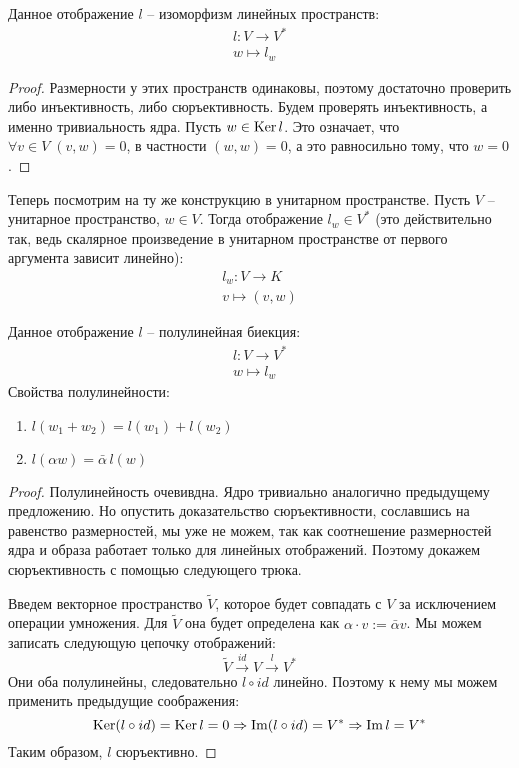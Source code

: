 \begin{theorem-non}
    Данное отображение $l$ -- изоморфизм линейных пространств: \begin{gather*}
        l: V \to  V^* \\
        w \mapsto  l_w
    \end{gather*}
\end{theorem-non}
\begin{proof}
    Размерности у этих пространств одинаковы, поэтому достаточно проверить либо инъективность, либо сюръективность.
    Будем проверять инъективность, а именно тривиальность ядра. Пусть $w \in \operatorname{Ker} l$. Это означает, что $\forall v \in V \; (v, w) = 0$, в частности $(w, w) = 0$, а это равносильно тому, что $w = 0$.
\end{proof}

\vspace*{7mm}

Теперь посмотрим на ту же конструкцию в унитарном пространстве.
Пусть $V$ -- унитарное пространство, $w \in V$. 
Тогда отображение $l_w \in V^*$ (это действительно так, ведь скалярное произведение в унитарном пространстве от первого аргумента зависит линейно): \begin{gather*}
    l_w: V \to K \\
    v \mapsto (v, w)
\end{gather*}
\begin{theorem-non}
    Данное отображение $l$ -- полулинейная биекция: \begin{gather*}
        l: V \to V^* \\
        w \mapsto l_w
    \end{gather*}
    Свойства полулинейности: \begin{enumerate}
        \item $l(w_1 + w_2) = l(w_1) + l(w_2)$
        \item $l(\alpha w) = \bar{\alpha}\, l(w)$
    \end{enumerate}
\end{theorem-non}
\begin{proof}
    Полулинейность очевивдна. 
    Ядро тривиально аналогично предыдущему предложению. 
    Но опустить доказательство сюръективности, сославшись на равенство размерностей, мы уже не можем, так как соотнешение размерностей ядра и образа работает только для линейных отображений.
    Поэтому докажем сюръективность с помощью следующего трюка.

    Введем векторное пространство $\tilde{V}$, которое будет совпадать с $V$ за исключением операции умножения.
    Для $\tilde{V}$ она будет определена как $\alpha \cdot v := \bar{\alpha}v$. 
    Мы можем записать следующую цепочку отображений: \[ \tilde{V} \overset{id}{\to} V \overset{l}{\to} V^* \]
    Они оба полулинейны, следовательно $l \circ id$ линейно. 
    Поэтому к нему мы можем применить предыдущие соображения: \[ \operatorname{Ker}(l \circ id) = \operatorname{Ker} l = 0 \Rightarrow \operatorname{Im}(l \circ id) = V^* \Rightarrow \operatorname{Im} l = V^*  \]
    Таким образом, $l$ сюръективно.
\end{proof}

